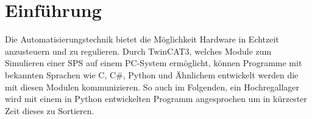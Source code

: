 \documentclass{fh-ium-bama}
\begin{document}
\pagestyle{fancy}
\fancyhf{}
\fancyhead[R]{\thepage} %
\fancyhead[C]{} 
\renewcommand{\headrulewidth}{0.5pt}
\fancyfoot[R]{\today}
\fancyfoot[C]{}
\renewcommand{\footrulewidth}{0.5pt}

\setcounter{page}{1} 
\tableofcontents
\label{tableofcontents}
\mainmatter

\chapter{Einführung}
Die Automatisierungstechnik bietet die Möglichkeit Hardware in Echtzeit anzusteuern und zu regulieren. Durch TwinCAT3, welches Module zum Simulieren einer SPS auf einem PC-System ermöglicht, können Programme mit bekannten Sprachen wie C, C\#, Python und Ähnlichem entwickelt werden die mit diesen Modulen kommunizieren. So auch im Folgenden, ein Hochregallager wird mit einem in Python entwickelten Programm angesprochen um in kürzester Zeit dieses zu Sortieren.
\end{document}
